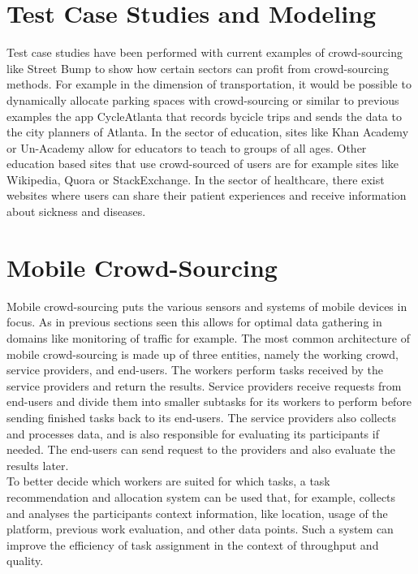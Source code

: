 \documentclass[a4paper,12pt]{report}
\begin{document}
	\section[Test Case Studies and Modeling]{Test Case Studies and Modeling \cite{CrowdSourcing}}
	\startsection
		Test case studies have been performed with current examples of crowd-sourcing like Street Bump to show how certain sectors can profit from crowd-sourcing methods. For example in the dimension of transportation, it would be possible to dynamically allocate parking spaces with crowd-sourcing or similar to previous examples the app CycleAtlanta that records bycicle trips and sends the data to the city planners of Atlanta. In the sector of education, sites like Khan Academy or Un-Academy allow for educators to teach to groups of all ages. Other education based sites that use crowd-sourced of users are for example sites like Wikipedia, Quora or StackExchange. In the sector of healthcare, there exist websites where users can share their patient experiences and receive information about sickness and diseases.
	\closesection

	\section[Mobile Crowd-Sourcing]{Mobile Crowd-Sourcing \cite{MobileCrowdSourcing}}
	\startsection
		Mobile crowd-sourcing puts the various sensors and systems of mobile devices in focus. As in previous sections seen this allows for optimal data gathering in domains like monitoring of traffic for example.
		The most common architecture of mobile crowd-sourcing is made up of three entities, namely the working crowd, service providers, and end-users. The workers perform tasks received by the service providers and return the results. Service providers receive requests from end-users and divide them into smaller subtasks for its workers to perform before sending finished tasks back to its end-users. The service providers also collects and processes data, and is also responsible for evaluating its participants if needed. The end-users can send request to the providers and also evaluate the results later.\\
		To better decide which workers are suited for which tasks, a task recommendation and allocation system can be used that, for example, collects and analyses the participants context information, like location, usage of the platform, previous work evaluation, and other data points. Such a system can improve the efficiency of task assignment in the context of throughput and quality.
\end{document}
